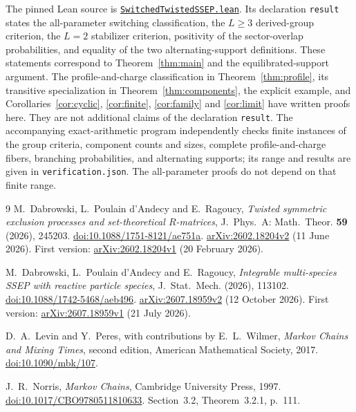 \documentclass[11pt]{article}
\theoremstyle{remark}
\begin{document}
The pinned Lean source is
\href{https://github.com/the-omega-institute/trureturing/blob/6bfc394bbd5147de839dd2116b985b438fcae8cf/D5/S3/StatisticalMechanics/ParticleProcesses/SwitchedTwistedSSEP.lean}{\texttt{SwitchedTwistedSSEP.lean}}.
Its declaration \texttt{result} states the all-parameter switching classification,
the $L\geq3$ derived-group criterion, the $L=2$ stabilizer criterion,
positivity of the sector-overlap probabilities, and equality of the two
alternating-support definitions. These statements correspond to
Theorem~\ref{thm:main} and the equilibrated-support argument.
The profile-and-charge classification in Theorem~\ref{thm:profile}, its
transitive specialization in Theorem~\ref{thm:components}, the explicit
example, and Corollaries~\ref{cor:cyclic}, \ref{cor:finite},
\ref{cor:family} and \ref{cor:limit} have written proofs here. They are not additional claims
of the declaration \texttt{result}. The accompanying exact-arithmetic program independently
checks finite instances of the group criteria, component counts and sizes,
complete profile-and-charge fibers, branching probabilities, and alternating supports;
its range and results are
given in \texttt{verification.json}. The all-parameter proofs do not depend
on that finite range.

\begin{thebibliography}{9}
M.~Dabrowski, L.~Poulain d'Andecy and E.~Ragoucy,
\emph{Twisted symmetric exclusion processes and set-theoretical $R$-matrices},
J.~Phys.~A: Math.~Theor. \textbf{59} (2026), 245203.
\href{https://doi.org/10.1088/1751-8121/ae751a}{doi:10.1088/1751-8121/ae751a}.
\href{https://arxiv.org/abs/2602.18204v2}{arXiv:2602.18204v2} (11 June 2026).
First version: \href{https://arxiv.org/abs/2602.18204v1}{arXiv:2602.18204v1}
(20 February 2026).

M.~Dabrowski, L.~Poulain d'Andecy and E.~Ragoucy,
\emph{Integrable multi-species SSEP with reactive particle species},
J.~Stat.~Mech. (2026), 113102.
\href{https://doi.org/10.1088/1742-5468/aeb496}{doi:10.1088/1742-5468/aeb496}.
\href{https://arxiv.org/abs/2607.18959v2}{arXiv:2607.18959v2} (12 October 2026).
First version: \href{https://arxiv.org/abs/2607.18959v1}{arXiv:2607.18959v1}
(21 July 2026).

D.~A.~Levin and Y.~Peres, with contributions by E.~L.~Wilmer,
\emph{Markov Chains and Mixing Times}, second edition,
American Mathematical Society, 2017.
\href{https://doi.org/10.1090/mbk/107}{doi:10.1090/mbk/107}.

J.~R.~Norris, \emph{Markov Chains}, Cambridge University Press, 1997.
\href{https://doi.org/10.1017/CBO9780511810633}{doi:10.1017/CBO9780511810633}.
Section~3.2, Theorem~3.2.1, p.~111.
\end{thebibliography}
\end{document}
